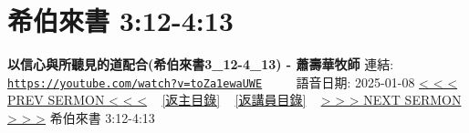 \documentclass{book}
\begin{document}
\section{希伯來書 3:12-4:13}
\label{sec:toZa1ewaUWE}
\textbf{以信心與所聽見的道配合(希伯來書3\_12-4\_13) - 蕭壽華牧師}
\newline
\newline
連結: \href{https://youtube.com/watch?v=toZa1ewaUWE}{\texttt{https://youtube.com/watch?v=toZa1ewaUWE}} ~~~~ 語音日期: 2025-01-08
\newline
\newline
\hyperref[sec:rP3BCIuRFDw]{< < < PREV SERMON < < <}
~
\hyperlink{toc}{[返主目錄]}
~
\hyperref[ch:preacher8]{[返講員目錄]}
~
\hyperref[sec:8LlYAk0Xlok]{> > > NEXT SERMON > > >}
\newline
\newline
希伯來書 3:12-4:13
\newline
\end{document}
